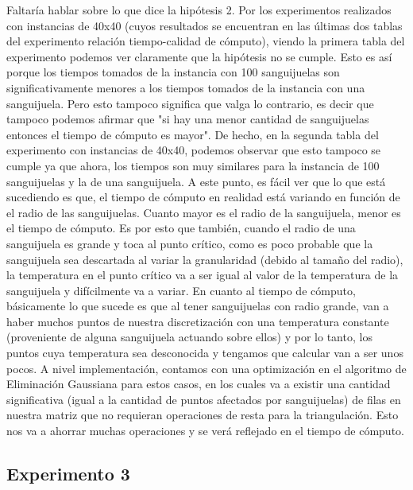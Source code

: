 \par Faltaría hablar sobre lo que dice la hipótesis 2. Por los experimentos realizados con instancias de 40x40 (cuyos resultados se encuentran en las últimas dos tablas del experimento relación tiempo-calidad de cómputo), viendo la primera tabla del experimento podemos ver claramente que la hipótesis no se cumple. Esto es así porque los tiempos tomados de la instancia con 100 sanguijuelas son significativamente menores a los tiempos tomados de la instancia con una sanguijuela. Pero esto tampoco significa que valga lo contrario, es decir que tampoco podemos afirmar que "si hay una menor cantidad de sanguijuelas entonces el tiempo de cómputo es mayor". De hecho, en la segunda tabla del experimento con instancias de 40x40, podemos observar que esto tampoco se cumple ya que ahora, los tiempos son muy similares para la instancia de 100 sanguijuelas y la de una sanguijuela. A este punto, es fácil ver que lo que está sucediendo es que, el tiempo de cómputo en realidad está variando en función de el radio de las sanguijuelas. Cuanto mayor es el radio de la sanguijuela, menor es el tiempo de cómputo. Es por esto que también, cuando el radio de una sanguijuela es grande y toca al punto crítico, como es poco probable que la sanguijuela sea descartada al variar la granularidad (debido al tamaño del radio), la temperatura en el punto crítico va a ser igual al valor de la temperatura de la sanguijuela y difícilmente va a variar. En cuanto al tiempo de cómputo, básicamente lo que sucede es que al tener sanguijuelas con radio grande, van a haber muchos puntos de nuestra discretización con una temperatura constante (proveniente de alguna sanguijuela actuando sobre ellos) y por lo tanto, los puntos cuya temperatura sea desconocida y tengamos que calcular van a ser unos pocos. A nivel implementación, contamos con una optimización en el algoritmo de Eliminación Gaussiana para estos casos, en los cuales va a existir una cantidad significativa (igual a la cantidad de puntos afectados por sanguijuelas) de filas en nuestra matriz que no requieran operaciones de resta para la triangulación. Esto nos va a ahorrar muchas operaciones y se verá reflejado en el tiempo de cómputo.

\subsection{Experimento 3}

